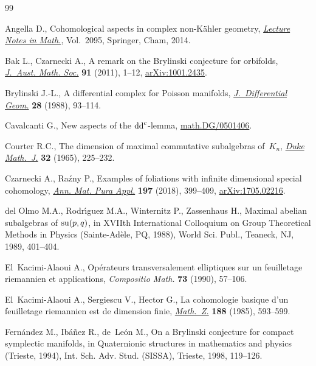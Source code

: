 \begin{thebibliography}{99}
\footnotesize\itemsep=0pt

Angella D., Cohomological aspects in complex non-{K}\"ahler geometry,
 \href{https://doi.org/10.1007/978-3-319-02441-7}{\textit{Lecture Notes in Math.}}, Vol.~2095, Springer, Cham, 2014.

Bak L., Czarnecki A., A remark on the {B}rylinski conjecture for orbifolds,
 \href{https://doi.org/10.1017/S1446788711001455}{\textit{J.~Aust. Math. Soc.}} \textbf{91} (2011), 1--12, \href{https://arxiv.org/abs/1001.2435}{arXiv:1001.2435}.

Brylinski J.-L., A differential complex for {P}oisson manifolds,
 \href{https://doi.org/10.4310/jdg/1214442161}{\textit{J.~Differential Geom.}} \textbf{28} (1988), 93--114.

Cavalcanti G., New aspects of the ${\rm dd}^c$-lemma, \href{https://arxiv.org/abs/math.DG/0501406}{math.DG/0501406}.

Courter R.C., The dimension of maximal commutative subalgebras of~{$K_{n}$},
 \href{https://doi.org/10.1215/S0012-7094-65-03219-9}{\textit{Duke Math.~J.}} \textbf{32} (1965), 225--232.

Czarnecki A., Ra\'zny P., Examples of foliations with infinite dimensional
 special cohomology, \href{https://doi.org/10.1007/s10231-017-0684-x}{\textit{Ann. Mat. Pura Appl.}} \textbf{197} (2018),
 399--409, \href{https://arxiv.org/abs/1705.02216}{arXiv:1705.02216}.

del Olmo M.A., Rodr\'{\i}guez M.A., Winternitz P., Zassenhaus H., Maximal
 abelian subalgebras of {${\rm su}(p,q)$}, in X{VII}th {I}nternational
 {C}olloquium on {G}roup {T}heoretical {M}ethods in {P}hysics
 ({S}ainte-{A}d\`ele, {PQ}, 1988), World Sci. Publ., Teaneck, NJ, 1989,
 401--404.

El~Kacimi-Alaoui A., Op\'erateurs transversalement elliptiques sur un
 feuilletage riemannien et applications, \textit{Compositio Math.} \textbf{73}
 (1990), 57--106.

El~Kacimi-Alaoui A., Sergiescu V., Hector G., La cohomologie basique d'un
 feuilletage riemannien est de dimension finie, \href{https://doi.org/10.1007/BF01161658}{\textit{Math.~Z.}} \textbf{188}
 (1985), 593--599.

Fern\'andez M., Ib\'a\~nez R., de~Le\'on M., On a {B}rylinski conjecture for
 compact symplectic manifolds, in Quaternionic structures in mathematics and
 physics ({T}rieste, 1994), Int. Sch. Adv. Stud. (SISSA), Trieste, 1998,
 119--126.


\end{thebibliography}
